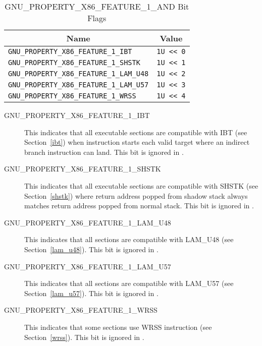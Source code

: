 \begin{table}[H]
\Hrule
  \caption{GNU_PROPERTY_X86_FEATURE_1_AND Bit Flags}
  \begin{center}
    \begin{tabular}[t]{l|l}
      \multicolumn{1}{c}{Name} & \multicolumn{1}{c}{Value} \\
      \hline
     \texttt{GNU_PROPERTY_X86_FEATURE_1_IBT} & \texttt{1U << 0} \\
     \texttt{GNU_PROPERTY_X86_FEATURE_1_SHSTK} & \texttt{1U << 1} \\
     \texttt{GNU_PROPERTY_X86_FEATURE_1_LAM_U48} & \texttt{1U << 2} \\
     \texttt{GNU_PROPERTY_X86_FEATURE_1_LAM_U57} & \texttt{1U << 3} \\
     \texttt{GNU_PROPERTY_X86_FEATURE_1_WRSS} & \texttt{1U << 4} \\
    \end{tabular}
  \end{center}
\Hrule
\end{table}

\begin{description}
 \item[GNU_PROPERTY_X86_FEATURE_1_IBT] This indicates that all executable
   sections are compatible with IBT (see Section~\ref{ibt}) when
    instruction starts each valid target where an indirect
   branch instruction can land.  This bit is ignored in
   .
 \item[GNU_PROPERTY_X86_FEATURE_1_SHSTK] This indicates that all
   executable sections are compatible with SHSTK (see Section~\ref{shstk})
   where return address popped from shadow stack always matches return
   address popped from normal stack.  This bit is ignored in
   .
 \item[GNU_PROPERTY_X86_FEATURE_1_LAM_U48] This indicates that all
   sections are compatible with LAM_U48 (see Section~\ref{lam_u48}).
   This bit is ignored in .
 \item[GNU_PROPERTY_X86_FEATURE_1_LAM_U57] This indicates that all
   sections are compatible with LAM_U57 (see Section~\ref{lam_u57}).
   This bit is ignored in .
 \item[GNU_PROPERTY_X86_FEATURE_1_WRSS] This indicates that some
   sections use WRSS instruction (see Section~\ref{wrss}).
   This bit is ignored in .
\end{description}

